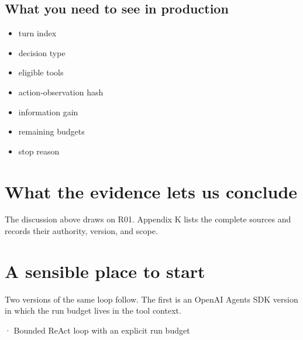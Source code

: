 \subsection{What you need to see in production}

\begin{itemize}

\item turn index

\item decision type

\item eligible tools

\item action-observation hash

\item information gain

\item remaining budgets

\item stop reason

\end{itemize}

\section{What the evidence lets us conclude}

The discussion above draws on R01. Appendix K lists the complete sources and records their authority, version, and scope.\par

\section{A sensible place to start}

Two versions of the same loop follow. The first is an OpenAI Agents SDK version in which the run budget lives in the tool context.\par

\BookSnake · Bounded ReAct loop with an explicit run budget\par

